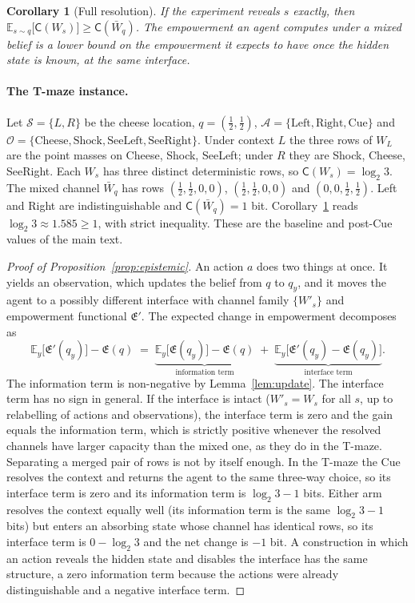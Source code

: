 \documentclass[letterpaper]{article} %
\newtheorem{corollary}{Corollary}
\theoremstyle{definition}
\providecommand{\E}{\mathbb{E}}
\providecommand{\cA}{\mathcal{A}}
\providecommand{\cO}{\mathcal{O}}
\providecommand{\cS}{\mathcal{S}}
\providecommand{\Emp}{\mathfrak{E}}
\providecommand{\Capa}{\mathsf{C}}
\begin{document}
\begin{corollary}[Full resolution]
\label{cor:resolve}
If the experiment reveals $s$ exactly, then $\E_{s \sim q}\big[\Capa(W_s)\big] \ge \Capa(\bar W_q)$. The empowerment an agent computes under a mixed belief is a lower bound on the empowerment it expects to have once the hidden state is known, at the same interface.
\end{corollary}

\paragraph{The T-maze instance.}
Let $\cS = \{L, R\}$ be the cheese location, $q = (\tfrac12, \tfrac12)$, $\cA = \{\text{Left}, \text{Right}, \text{Cue}\}$ and $\cO = \{\text{Cheese}, \text{Shock}, \text{SeeLeft}, \text{SeeRight}\}$. Under context $L$ the three rows of $W_L$ are the point masses on Cheese, Shock, SeeLeft; under $R$ they are Shock, Cheese, SeeRight. Each $W_s$ has three distinct deterministic rows, so $\Capa(W_s) = \log_2 3$. The mixed channel $\bar W_q$ has rows $(\tfrac12, \tfrac12, 0, 0)$, $(\tfrac12, \tfrac12, 0, 0)$ and $(0, 0, \tfrac12, \tfrac12)$. Left and Right are indistinguishable and $\Capa(\bar W_q) = 1$ bit. Corollary~\ref{cor:resolve} reads $\log_2 3 \approx 1.585 \ge 1$, with strict inequality. These are the baseline and post-Cue values of the main text.

\begin{proof}[Proof of Proposition~\ref{prop:epistemic}]
An action $a$ does two things at once. It yields an observation, which updates the belief from $q$ to $q_y$, and it moves the agent to a possibly different interface with channel family $\{W'_s\}$ and empowerment functional $\Emp'$. The expected change in empowerment decomposes as
\begin{equation}
  \E_y\big[\Emp'(q_y)\big] - \Emp(q)
  \;=\;
  \underbrace{\E_y\big[\Emp(q_y)\big] - \Emp(q)}_{\text{information term}}
  \;+\;
  \underbrace{\E_y\big[\Emp'(q_y) - \Emp(q_y)\big]}_{\text{interface term}} .
  \label{eq:decomp}
\end{equation}
The information term is non-negative by Lemma~\ref{lem:update}. The interface term has no sign in general. If the interface is intact ($W'_s = W_s$ for all $s$, up to relabelling of actions and observations), the interface term is zero and the gain equals the information term, which is strictly positive whenever the resolved channels have larger capacity than the mixed one, as they do in the T-maze. Separating a merged pair of rows is not by itself enough. In the T-maze the Cue resolves the context and returns the agent to the same three-way choice, so its interface term is zero and its information term is $\log_2 3 - 1$ bits. Either arm resolves the context equally well (its information term is the same $\log_2 3 - 1$ bits) but enters an absorbing state whose channel has identical rows, so its interface term is $0 - \log_2 3$ and the net change is $-1$ bit. A construction in which an action reveals the hidden state and disables the interface has the same structure, a zero information term because the actions were already distinguishable and a negative interface term.
\end{proof}
\end{document}
